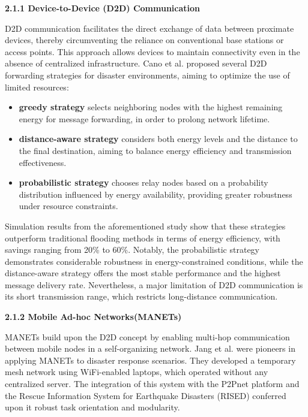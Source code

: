         \vspace{0.8em}
        \noindent\textbf{2.1.1 Device-to-Device (D2D) Communication}\par
        \vspace{0.3em}
            \sloppy D2D communication facilitates the direct exchange of data between proximate devices, thereby circumventing the reliance on conventional base stations or access points. This approach allows devices to maintain connectivity even in the absence of centralized infrastructure. Cano et al. proposed several D2D forwarding strategies for disaster environments, aiming to optimize the use of limited resources:
            \begin{itemize}
                \item \textbf{greedy strategy} selects neighboring nodes with the highest remaining energy for message forwarding, in order to prolong network lifetime.
                \item \textbf{distance-aware strategy} considers both energy levels and the distance to the final destination, aiming to balance energy efficiency and transmission effectiveness.
                \item \textbf{probabilistic strategy} chooses relay nodes based on a probability distribution influenced by energy availability, providing greater robustness under resource constraints.
            \end{itemize}
            \vspace{0.4em}
            Simulation results from the aforementioned study show that these strategies outperform traditional flooding methods in terms of energy efficiency, with savings ranging from 20\% to 60\%. Notably, the probabilistic strategy demonstrates considerable robustness in energy-constrained conditions, while the distance-aware strategy offers the most stable performance and the highest message delivery rate. Nevertheless, a major limitation of D2D communication is its short transmission range, which restricts long-distance communication.

        \vspace{1em}
        \noindent\textbf{2.1.2 Mobile Ad-hoc Networks(MANETs)}\par
        \vspace{0.2em}
            MANETs build upon the D2D concept by enabling multi-hop communication between mobile nodes in a self-organizing network. Jang et al. were pioneers in applying MANETs to disaster response scenarios. They developed a temporary mesh network using WiFi-enabled laptops, which operated without any centralized server. The integration of this system with the P2Pnet platform and the Rescue Information System for Earthquake Disasters (RISED) conferred upon it robust task orientation and modularity.

